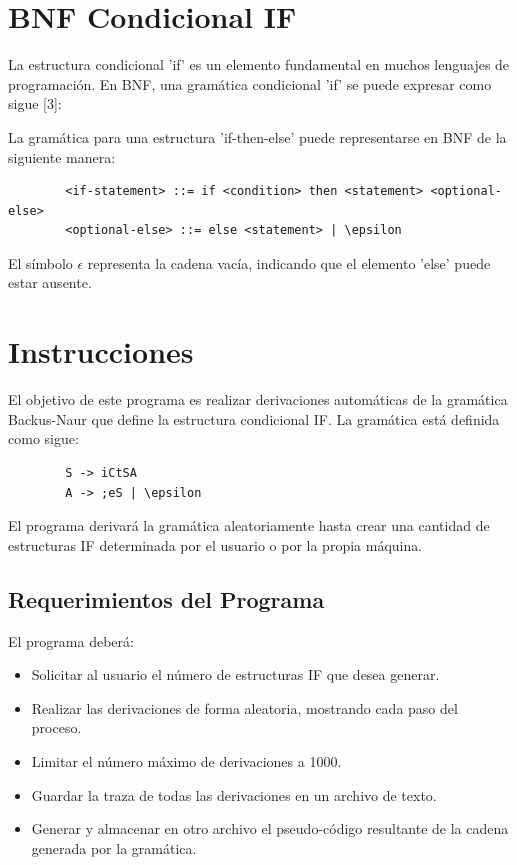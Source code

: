 \documentclass[11pt]{article} %
\begin{document}
	\section{BNF Condicional IF}
	La estructura condicional 'if' es un elemento fundamental en muchos lenguajes de programación. En BNF, una gramática condicional 'if' se puede expresar como sigue [3]:
	
	La gramática para una estructura 'if-then-else' puede representarse en BNF de la siguiente manera:
	\begin{verbatim}
		<if-statement> ::= if <condition> then <statement> <optional-else>
		<optional-else> ::= else <statement> | \epsilon
	\end{verbatim}
	El símbolo \( \epsilon \) representa la cadena vacía, indicando que el elemento 'else' puede estar ausente.
	
	\section{Instrucciones}
	
	El objetivo de este programa es realizar derivaciones automáticas de la gramática Backus-Naur que define la estructura condicional IF. La gramática está definida como sigue:
	\begin{lstlisting}
		S -> iCtSA
		A -> ;eS | \epsilon
	\end{lstlisting}
	El programa derivará la gramática aleatoriamente hasta crear una cantidad de estructuras IF determinada por el usuario o por la propia máquina.
	
	\subsection*{Requerimientos del Programa}
	El programa deberá:
	\begin{itemize}
		\item Solicitar al usuario el número de estructuras IF que desea generar.
		\item Realizar las derivaciones de forma aleatoria, mostrando cada paso del proceso.
		\item Limitar el número máximo de derivaciones a 1000.
		\item Guardar la traza de todas las derivaciones en un archivo de texto.
		\item Generar y almacenar en otro archivo el pseudo-código resultante de la cadena generada por la gramática.
	\end{itemize}
	
\end{document}
